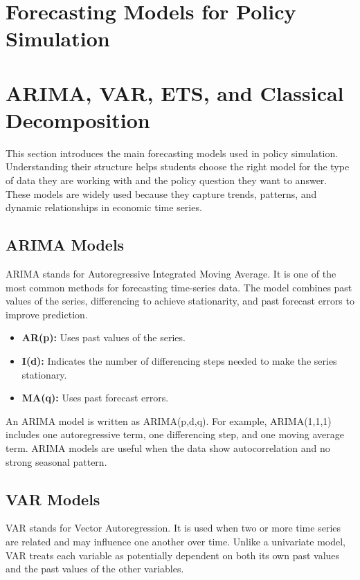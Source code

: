 \documentclass[12pt,a4paper]{article}
\begin{document}
\section*{Forecasting Models for Policy Simulation}

\section{ARIMA, VAR, ETS, and Classical Decomposition}

This section introduces the main forecasting models used in policy simulation. Understanding their structure helps students choose the right model for the type of data they are working with and the policy question they want to answer. These models are widely used because they capture trends, patterns, and dynamic relationships in economic time series.

\subsection{ARIMA Models}

ARIMA stands for Autoregressive Integrated Moving Average. It is one of the most common methods for forecasting time-series data. The model combines past values of the series, differencing to achieve stationarity, and past forecast errors to improve prediction.

\begin{itemize}
    \item \textbf{AR(p):} Uses past values of the series.
    \item \textbf{I(d):} Indicates the number of differencing steps needed to make the series stationary.
    \item \textbf{MA(q):} Uses past forecast errors.
\end{itemize}

An ARIMA model is written as ARIMA(p,d,q). For example, ARIMA(1,1,1) includes one autoregressive term, one differencing step, and one moving average term. ARIMA models are useful when the data show autocorrelation and no strong seasonal pattern.

\subsection{VAR Models}

VAR stands for Vector Autoregression. It is used when two or more time series are related and may influence one another over time. Unlike a univariate model, VAR treats each variable as potentially dependent on both its own past values and the past values of the other variables.
\end{document}
